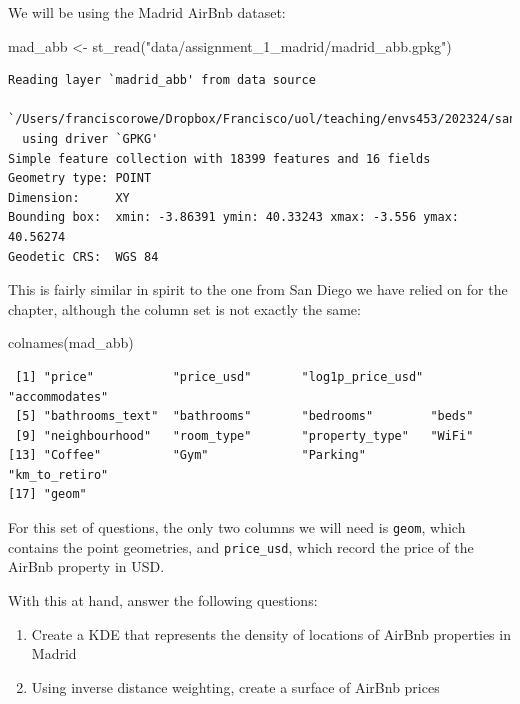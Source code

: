 \documentclass[
  letterpaper,
  DIV=11,
  numbers=noendperiod,
  oneside]{scrreprt}
\newenvironment{Shaded}{\begin{snugshade}}{\end{snugshade}}
\newcommand{\FunctionTok}[1]{\textcolor[rgb]{0.28,0.35,0.67}{#1}}
\newcommand{\NormalTok}[1]{\textcolor[rgb]{0.00,0.23,0.31}{#1}}
\newcommand{\OtherTok}[1]{\textcolor[rgb]{0.00,0.23,0.31}{#1}}
\newcommand{\StringTok}[1]{\textcolor[rgb]{0.13,0.47,0.30}{#1}}
\providecommand{\tightlist}{%
  \setlength{\itemsep}{0pt}\setlength{\parskip}{0pt}}\usepackage{longtable,booktabs,array}
\begin{document}
We will be using the Madrid AirBnb dataset:

\begin{Shaded}
\begin{Highlighting}[]
\NormalTok{mad\_abb }\OtherTok{\textless{}{-}} \FunctionTok{st\_read}\NormalTok{(}\StringTok{"data/assignment\_1\_madrid/madrid\_abb.gpkg"}\NormalTok{)}
\end{Highlighting}
\end{Shaded}

\begin{verbatim}
Reading layer `madrid_abb' from data source 
  `/Users/franciscorowe/Dropbox/Francisco/uol/teaching/envs453/202324/san/data/assignment_1_madrid/madrid_abb.gpkg' 
  using driver `GPKG'
Simple feature collection with 18399 features and 16 fields
Geometry type: POINT
Dimension:     XY
Bounding box:  xmin: -3.86391 ymin: 40.33243 xmax: -3.556 ymax: 40.56274
Geodetic CRS:  WGS 84
\end{verbatim}

This is fairly similar in spirit to the one from San Diego we have
relied on for the chapter, although the column set is not exactly the
same:

\begin{Shaded}
\begin{Highlighting}[]
\FunctionTok{colnames}\NormalTok{(mad\_abb)}
\end{Highlighting}
\end{Shaded}

\begin{verbatim}
 [1] "price"           "price_usd"       "log1p_price_usd" "accommodates"   
 [5] "bathrooms_text"  "bathrooms"       "bedrooms"        "beds"           
 [9] "neighbourhood"   "room_type"       "property_type"   "WiFi"           
[13] "Coffee"          "Gym"             "Parking"         "km_to_retiro"   
[17] "geom"           
\end{verbatim}

For this set of questions, the only two columns we will need is
\texttt{geom}, which contains the point geometries, and
\texttt{price\_usd}, which record the price of the AirBnb property in
USD.

With this at hand, answer the following questions:

\begin{enumerate}
\def\labelenumi{\arabic{enumi}.}
\tightlist
\item
  Create a KDE that represents the density of locations of AirBnb
  properties in Madrid
\item
  Using inverse distance weighting, create a surface of AirBnb prices
\end{enumerate}
\end{document}
